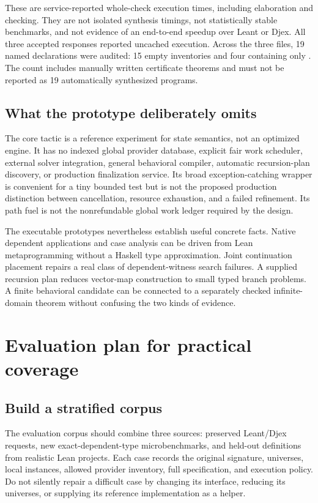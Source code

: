 \documentclass[11pt,letterpaper]{article}
\newcommand{\id}[1]{\texttt{\detokenize{#1}}}
\theoremstyle{definition}
\theoremstyle{remark}
\begin{document}
These are service-reported whole-check execution times, including elaboration and checking. They are not isolated synthesis timings, not statistically stable benchmarks, and not evidence of an end-to-end speedup over Leant or Djex. All three accepted responses reported uncached execution. Across the three files, 19 named declarations were audited: 15 empty inventories and four containing only \id{propext}. The count includes manually written certificate theorems and must not be reported as 19 automatically synthesized programs.

\subsection{What the prototype deliberately omits}

The core tactic is a reference experiment for state semantics, not an optimized engine. It has no indexed global provider database, explicit fair work scheduler, external solver integration, general behavioral compiler, automatic recursion-plan discovery, or production finalization service. Its broad exception-catching wrapper is convenient for a tiny bounded test but is not the proposed production distinction between cancellation, resource exhaustion, and a failed refinement. Its path fuel is not the nonrefundable global work ledger required by the design.

The executable prototypes nevertheless establish useful concrete facts. Native dependent applications and case analysis can be driven from Lean metaprogramming without a Haskell type approximation. Joint continuation placement repairs a real class of dependent-witness search failures. A supplied recursion plan reduces vector-map construction to small typed branch problems. A finite behavioral candidate can be connected to a separately checked infinite-domain theorem without confusing the two kinds of evidence.

\section{Evaluation plan for practical coverage}
\label{sec:evaluation}

\subsection{Build a stratified corpus}

The evaluation corpus should combine three sources: preserved Leant/Djex requests, new exact-dependent-type microbenchmarks, and held-out definitions from realistic Lean projects. Each case records the original signature, universes, local instances, allowed provider inventory, full specification, and execution policy. Do not silently repair a difficult case by changing its interface, reducing its universes, or supplying its reference implementation as a helper.
\end{document}
